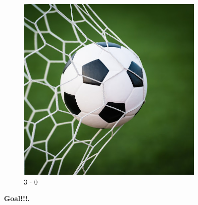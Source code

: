 \documentclass{article}
\begin{document}
\begin{figure}[h!]
\begin{subfigure}[b]{0.4\linewidth}
			\includegraphics[width=\linewidth]{ball.jpg}
			\caption{3 - 0}
		\end{subfigure}
			\caption{\textbf {Goal!!!.}}
			\label{fig:man}
	\end{figure}
\end{document}
